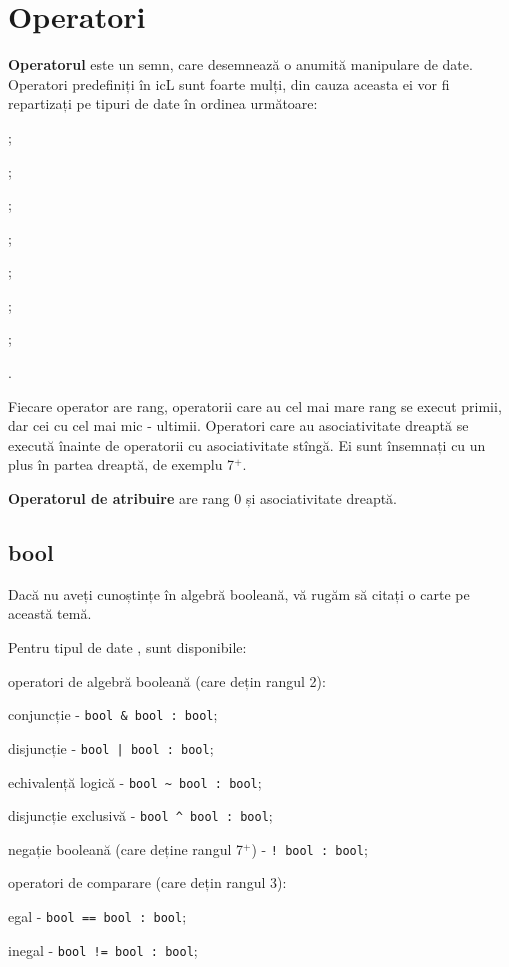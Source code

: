 \section{Operatori}

{\bf Operatorul} este un semn, care desemnează o anumită manipulare de date. Operatori predefiniți în icL sunt foarte mulți, din cauza aceasta ei vor fi repartizați pe tipuri de date în ordinea următoare:

\begin{icEnum}
	\item \bool{};
	\item \integer{};
	\item \double{};
	\item \str{};
	\item \listtype{};
	\item \object{};
	\item \set{};
	\item \void{}.
\end{icEnum}

Fiecare operator are rang, operatorii care au cel mai mare rang se execut primii, dar cei cu cel mai mic - ultimii. Operatori care au asociativitate dreaptă se execută înainte de operatorii cu asociativitate stîngă. Ei sunt însemnați cu un plus în partea dreaptă, de exemplu 7$^+$.

{\bf Operatorul de atribuire} are rang 0 și asociativitate dreaptă.

\subsection{\color{lightblue}bool}

Dacă nu aveți cunoștințe în algebră booleană, vă rugăm să citați o carte pe această temă.

Pentru tipul de date \bool{}, sunt disponibile:

\begin{icItems}
	\item
		operatori de algebră booleană (care dețin rangul 2):
	\begin{icItems}
		\item
			conjuncție - \lstinline|bool & bool : bool|;
		\item
			disjuncție - \lstinline`bool | bool : bool`;
		\item
			echivalență logică - \lstinline|bool ~ bool : bool|;
		\item
			disjuncție exclusivă - \lstinline|bool ^ bool : bool|;
		\item
			negație booleană (care deține rangul 7$^+$) - \lstinline|! bool : bool|;
	\end{icItems}

	\item
		operatori de comparare (care dețin rangul 3):
	\begin{icItems}
		\item
			egal - \lstinline|bool == bool : bool|;
		\item
			inegal - \lstinline|bool != bool : bool|;
	\end{icItems}
\end{icItems}

